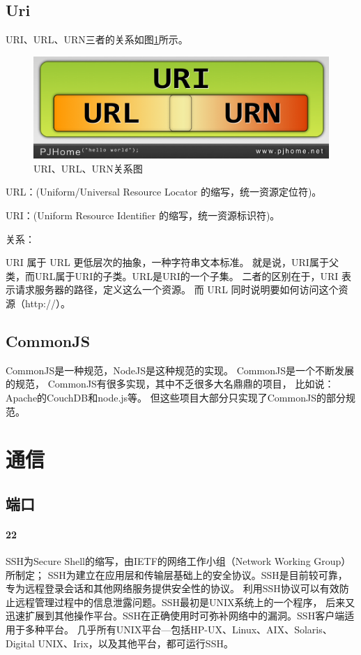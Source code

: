 \documentclass{book}
\begin{document}
\subsection{Uri}

URI、URL、URN三者的关系如图\ref{fig:RelationshipOfUriUrlUrn}所示。

\begin{figure}[htbp]
	\centering
	\includegraphics[scale=0.5]{RelationshipOfUriUrlUrn.png}
	\caption{URI、URL、URN关系图}
	\label{fig:RelationshipOfUriUrlUrn}
\end{figure}

URL：(Uniform/Universal Resource Locator 的缩写，统一资源定位符)。

URI：(Uniform Resource Identifier 的缩写，统一资源标识符)。

关系：

URI 属于 URL 更低层次的抽象，一种字符串文本标准。
就是说，URI属于父类，而URL属于URI的子类。URL是URI的一个子集。
二者的区别在于，URI 表示请求服务器的路径，定义这么一个资源。
而 URL 同时说明要如何访问这个资源（http://）。

\subsection{CommonJS}

CommonJS是一种规范，NodeJS是这种规范的实现。
CommonJS是一个不断发展的规范，
CommonJS有很多实现，其中不乏很多大名鼎鼎的项目，
比如说：Apache的CouchDB和node.js等。
但这些项目大部分只实现了CommonJS的部分规范。

\section{通信}

\subsection{端口}

\paragraph{22} SSH为Secure Shell的缩写，由IETF的网络工作小组（Network Working Group）所制定；
SSH为建立在应用层和传输层基础上的安全协议。SSH是目前较可靠，专为远程登录会话和其他网络服务提供安全性的协议。
利用SSH协议可以有效防止远程管理过程中的信息泄露问题。SSH最初是UNIX系统上的一个程序，
后来又迅速扩展到其他操作平台。SSH在正确使用时可弥补网络中的漏洞。SSH客户端适用于多种平台。
几乎所有UNIX平台—包括HP-UX、Linux、AIX、Solaris、Digital UNIX、Irix，以及其他平台，都可运行SSH。
\end{document}
